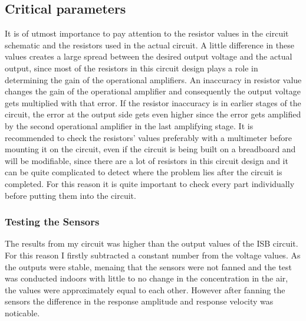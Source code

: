 \subsection{Critical parameters}
\label{sub:criticalParameters}

It is of utmost importance to pay attention to the resistor values in the circuit schematic and the resistors used in the actual circuit. A little difference in these values creates a large spread between the desired output voltage and the actual output, since most of the resistors in this circuit design plays a role in determining the gain of the operational amplifiers. An inaccuracy in resistor value changes the gain of the operational amplifier and consequently the output voltage gets multiplied with that error. If the resistor inaccuracy is in earlier stages of the circuit, the error at the output side gets even higher since the error gets amplified by the second operational amplifier in the last amplifying stage. It is recommended to check the resistors' values preferably with a multimeter before mounting it on the circuit, even if the circuit is being built on a breadboard and will be modifiable, since there are a lot of resistors in this circuit design and it can be quite complicated to detect where the problem lies after the circuit is completed. For this reason it is quite important to check every part individually before putting them into the circuit. \par 




\subsubsection{Testing the Sensors}
The results from my circuit was higher than the output values of the ISB circuit. For this reason I firstly subtracted a constant number from the voltage values. As the outputs were stable, menaing that the sensors were not fanned and the test was conducted indoors with little to no change in the  concentration in the air, the values were approximately equal to each other. However after fanning the sensors the difference in the response amplitude and response velocity was noticable. 